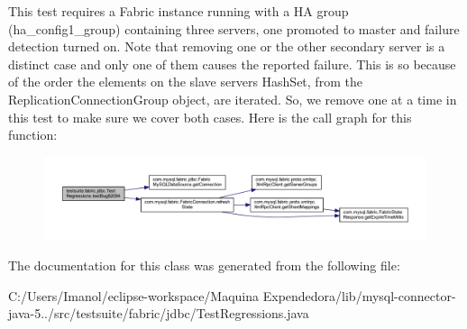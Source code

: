 This test requires a Fabric instance running with a HA group (ha\+\_\+config1\+\_\+group) containing three servers, one promoted to master and failure detection turned on. Note that removing one or the other secondary server is a distinct case and only one of them causes the reported failure. This is so because of the order the elements on the slave servers Hash\+Set, from the Replication\+Connection\+Group object, are iterated. So, we remove one at a time in this test to make sure we cover both cases. Here is the call graph for this function\+:
\nopagebreak
\begin{figure}[H]
\begin{center}
\leavevmode
\includegraphics[width=350pt]{classtestsuite_1_1fabric_1_1jdbc_1_1_test_regressions_a7b46187e3a7d4a9951d8cd51344b090e_cgraph}
\end{center}
\end{figure}


The documentation for this class was generated from the following file\+:\begin{DoxyCompactItemize}
\item 
C\+:/\+Users/\+Imanol/eclipse-\/workspace/\+Maquina Expendedora/lib/mysql-\/connector-\/java-\/5../src/testsuite/fabric/jdbc/Test\+Regressions.\+java\end{DoxyCompactItemize}

